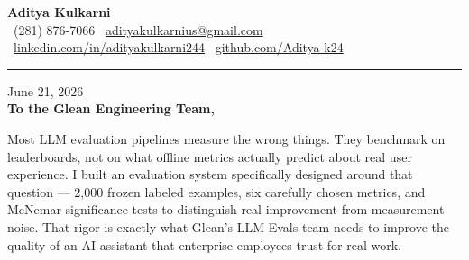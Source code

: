 \documentclass[11pt,letterpaper]{article}
\begin{document}
\begin{center}
    {\Huge \textbf{\color{GleanBlue} Aditya Kulkarni}}\\[8pt]
    {\color{DarkGrey} \small
    \faPhone \ (281) 876-7066 \quad \textbar \quad
    \faEnvelope \ \href{mailto:adityakulkarnius@gmail.com}{adityakulkarnius@gmail.com} \\[4pt]
    \faLinkedin \ \href{https://linkedin.com/in/adityakulkarni244}{linkedin.com/in/adityakulkarni244} \quad \textbar \quad
    \faGithub \ \href{https://github.com/Aditya-k24}{github.com/Aditya-k24}
    }
\end{center}
\vspace{-4pt}
{\color{GleanBlue}\rule{\linewidth}{1.5pt}}
\vspace{10pt}

June 21, 2026\\[10pt]
\textbf{To the Glean Engineering Team,}

\vspace{6pt}

Most LLM evaluation pipelines measure the wrong things. They benchmark on leaderboards, not on what offline metrics actually predict about real user experience. I built an evaluation system specifically designed around that question --- 2,000 frozen labeled examples, six carefully chosen metrics, and McNemar significance tests to distinguish real improvement from measurement noise. That rigor is exactly what Glean's LLM Evals team needs to improve the quality of an AI assistant that enterprise employees trust for real work.
\end{document}
